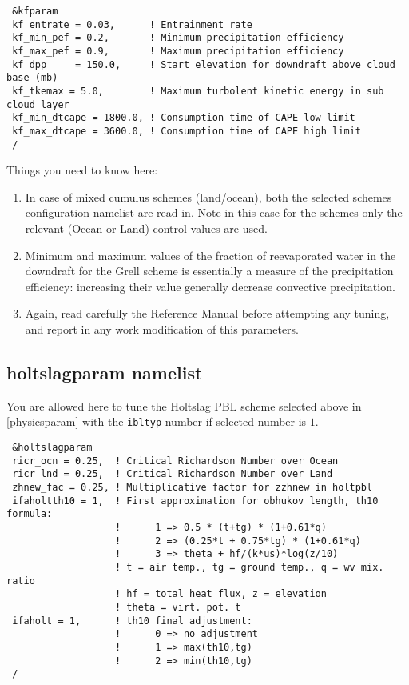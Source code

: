 {\begin{Verbatim}
 &kfparam
 kf_entrate = 0.03,      ! Entrainment rate
 kf_min_pef = 0.2,       ! Minimum precipitation efficiency
 kf_max_pef = 0.9,       ! Maximum precipitation efficiency
 kf_dpp     = 150.0,     ! Start elevation for downdraft above cloud base (mb)
 kf_tkemax = 5.0,        ! Maximum turbolent kinetic energy in sub cloud layer
 kf_min_dtcape = 1800.0, ! Consumption time of CAPE low limit
 kf_max_dtcape = 3600.0, ! Consumption time of CAPE high limit
 /
\end{Verbatim}
}

Things you need to know here:

\begin{enumerate}
\item In case of mixed cumulus schemes (land/ocean), both the selected
schemes configuration namelist are read in.  Note in this case for the
schemes only the relevant (Ocean or Land) control values are used.
\item Minimum and maximum values of the fraction of reevaporated water in the
downdraft for the Grell scheme is essentially a measure of the precipitation
efficiency: increasing their value generally decrease convective precipitation.
\item Again, read carefully the Reference Manual before attempting any tuning,
and report in any work modification of this parameters.
\end{enumerate}

\subsection{holtslagparam namelist}

You are allowed here to tune the Holtslag PBL scheme selected above in
\ref{physicsparam} with the \verb=ibltyp= number if selected number is
$1$. 

{\footnotesize
\begin{Verbatim}
 &holtslagparam
 ricr_ocn = 0.25,  ! Critical Richardson Number over Ocean
 ricr_lnd = 0.25,  ! Critical Richardson Number over Land
 zhnew_fac = 0.25, ! Multiplicative factor for zzhnew in holtpbl
 ifaholtth10 = 1,  ! First approximation for obhukov length, th10 formula:
                   !      1 => 0.5 * (t+tg) * (1+0.61*q)
                   !      2 => (0.25*t + 0.75*tg) * (1+0.61*q)
                   !      3 => theta + hf/(k*us)*log(z/10)
                   ! t = air temp., tg = ground temp., q = wv mix. ratio
                   ! hf = total heat flux, z = elevation
                   ! theta = virt. pot. t
 ifaholt = 1,      ! th10 final adjustment:
                   !      0 => no adjustment
                   !      1 => max(th10,tg)
                   !      2 => min(th10,tg)
 /
\end{Verbatim}
}

